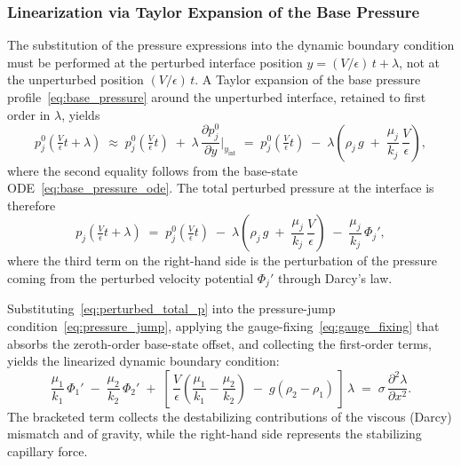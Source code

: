 \subsubsection{Linearization via Taylor Expansion of the Base Pressure}

The substitution of the pressure expressions into the dynamic boundary condition must be performed at the perturbed interface position $y = (V/\epsilon)\,t + \lambda$, not at the unperturbed position $(V/\epsilon)\,t$. A Taylor expansion of the base pressure profile~\eqref{eq:base_pressure} around the unperturbed interface, retained to first order in $\lambda$, yields
\begin{equation}
\label{eq:taylor_base}
p_j^0\!\left(\tfrac{V}{\epsilon}t + \lambda\right)
\;\approx\; p_j^0\!\left(\tfrac{V}{\epsilon}t\right) \;+\; \lambda\,\frac{\partial p_j^0}{\partial y}\bigg|_{y_{\mathrm{int}}}
\;=\; p_j^0\!\left(\tfrac{V}{\epsilon}t\right) \;-\; \lambda\!\left(\rho_j\, g \;+\; \frac{\mu_j}{k_j}\,\frac{V}{\epsilon}\right),
\end{equation}
where the second equality follows from the base-state ODE~\eqref{eq:base_pressure_ode}. The total perturbed pressure at the interface is therefore
\begin{equation}
\label{eq:perturbed_total_p}
p_j\!\left(\tfrac{V}{\epsilon}t + \lambda\right)
\;=\; p_j^0\!\left(\tfrac{V}{\epsilon}t\right)
\;-\; \lambda\!\left(\rho_j\, g \;+\; \frac{\mu_j}{k_j}\,\frac{V}{\epsilon}\right)
\;-\; \frac{\mu_j}{k_j}\,\Phi_j',
\end{equation}
where the third term on the right-hand side is the perturbation of the pressure coming from the perturbed velocity potential $\Phi_j'$ through Darcy's law.

Substituting~\eqref{eq:perturbed_total_p} into the pressure-jump condition~\eqref{eq:pressure_jump}, applying the gauge-fixing~\eqref{eq:gauge_fixing} that absorbs the zeroth-order base-state offset, and collecting the first-order terms, yields the linearized dynamic boundary condition:
\begin{equation} \label{eq:dynamic_linear}
    \frac{\mu_1}{k_1}\, \Phi_1' \;-\; \frac{\mu_2}{k_2}\, \Phi_2'
    \;+\; \left[\, \frac{V}{\epsilon}\!\left(\frac{\mu_1}{k_1} - \frac{\mu_2}{k_2}\right)
    \;-\; g(\rho_2 - \rho_1)\,\right]\,\lambda
    \;=\; \sigma\, \frac{\partial^2 \lambda}{\partial x^2}.
\end{equation}
The bracketed term collects the destabilizing contributions of the viscous (Darcy) mismatch and of gravity, while the right-hand side represents the stabilizing capillary force.


